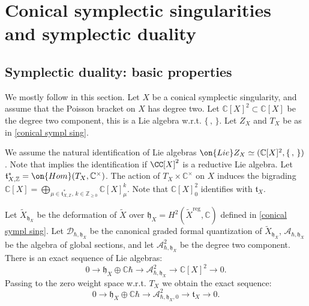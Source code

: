 \documentclass[12pt]{amsart}
\begin{document}
\section{Conical symplectic singularities and symplectic duality}\label{sec_sympldual}
 



\subsection{Symplectic duality: basic properties}\label{sect_sympl_duality_basic} We mostly follow \cite{kmp} in this section. 
 Let $X$ be a conical symplectic singularity, and assume that the Poisson bracket on $X$ has degree two. Let $\mathbb{C}[X]^2 \subset \mathbb{C}[X]$ be the degree two component, this is a Lie algebra w.r.t. $\{\,,\,\}$. Let $Z_X$ and $T_X$ be as in \cref{conical sympl sing}. 
    
    We assume the natural identification of Lie algebras $\on{Lie}Z_X \simeq (\mathbb{C}[X]^2,\{\,,\,\})$. Note that \cite[Proposition 2.14]{Losev4} implies the identification if $\CC[X]^2$ is a reductive Lie algebra. Let $\mathfrak{t}^*_{X,\mathbb{Z}}=\on{Hom}(T_X,\mathbb{C}^\times)$. The action of $T_X \times \mathbb{C}^\times$ on $X$ induces the bigrading $\mathbb{C}[X]=\bigoplus_{\mu \in \mathfrak{t}^*_{X,\mathbb{Z}},\, k \in \mathbb{Z}_{\geqslant 0}}\mathbb{C}[X]^k_\mu$. Note that $\mathbb{C}[X]^2_0$ identifies with $\mathfrak{t}_X$.



    Let $\widetilde{X}_{\mathfrak{h}_X}$ be the deformation of $\widetilde{X}$ over $\mathfrak{h}_X=H^2(\widetilde{X}^{\mathrm{reg}},\mathbb{C})$ defined in \cref{conical sympl sing}. Let $\mathcal{D}_{\hbar, \mathfrak{h}_X}$ be the canonical graded formal quantization of $\widetilde{X}_{\mathfrak{h}_X}$, $\mathcal{A}_{\hbar, \mathfrak{h}_X}$ be the algebra of global sections, and let $\mathcal{A}_{\hbar, \mathfrak{h}_X}^2$ be the degree two component. There is an exact sequence of Lie algebras:
    \begin{equation*}
    0 \rightarrow \mathfrak{h}_X \oplus \mathbb{C}\hbar \rightarrow \mathcal{A}_{\hbar, \mathfrak{h}_X}^2 \rightarrow \mathbb{C}[X]^2 \rightarrow 0.
    \end{equation*}
Passing to the zero weight space w.r.t. $T_X$ we obtain the exact sequence:
    \begin{equation}\label{exact_seq_alg}
    0 \rightarrow \mathfrak{h}_X \oplus \mathbb{C}\hbar \rightarrow \mathcal{A}_{\hbar, 
    \mathfrak{h}_X,0}^2 \rightarrow \mathfrak{t}_X \rightarrow 0.
    \end{equation}
\end{document}
